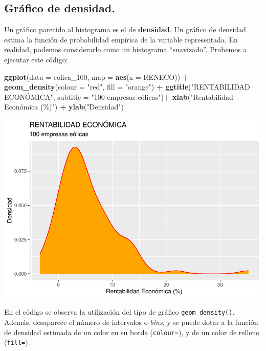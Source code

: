 \documentclass[
]{book}
\newenvironment{Shaded}{\begin{snugshade}}{\end{snugshade}}
\newcommand{\AttributeTok}[1]{\textcolor[rgb]{0.13,0.29,0.53}{#1}}
\newcommand{\FunctionTok}[1]{\textcolor[rgb]{0.13,0.29,0.53}{\textbf{#1}}}
\newcommand{\NormalTok}[1]{#1}
\newcommand{\SpecialCharTok}[1]{\textcolor[rgb]{0.81,0.36,0.00}{\textbf{#1}}}
\newcommand{\StringTok}[1]{\textcolor[rgb]{0.31,0.60,0.02}{#1}}
\let\Oldincludegraphics\includegraphics
\renewcommand{\includegraphics}[2][]{%
  \Oldincludegraphics[#1]{#2}%
}
\begin{document}
\subsection{Gráfico de densidad.}\label{gruxe1fico-de-densidad.}

Un gráfico parecido al histograma es el de \textbf{densidad}. Un gráfico de densidad estima la función de probabilidad empírica de la variable representada. En realidad, podemos considerarlo como un histograma ``suavizado''. Probemos a ejecutar este código:

\begin{Shaded}
\begin{Highlighting}[]
\FunctionTok{ggplot}\NormalTok{(}\AttributeTok{data =}\NormalTok{ eolica\_100, }\AttributeTok{map =} \FunctionTok{aes}\NormalTok{(}\AttributeTok{x =}\NormalTok{ RENECO)) }\SpecialCharTok{+}
  \FunctionTok{geom\_density}\NormalTok{(}\AttributeTok{colour =} \StringTok{"red"}\NormalTok{, }\AttributeTok{fill =} \StringTok{"orange"}\NormalTok{) }\SpecialCharTok{+}
  \FunctionTok{ggtitle}\NormalTok{(}\StringTok{"RENTABILIDAD ECONÓMICA"}\NormalTok{, }\AttributeTok{subtitle =} \StringTok{"100 empresas eólicas"}\NormalTok{)}\SpecialCharTok{+}
  \FunctionTok{xlab}\NormalTok{(}\StringTok{"Rentabilidad Económica (\%)"}\NormalTok{) }\SpecialCharTok{+}
  \FunctionTok{ylab}\NormalTok{(}\StringTok{"Densidad"}\NormalTok{)}
\end{Highlighting}
\end{Shaded}

\includegraphics{_main_files/figure-latex/unnamed-chunk-111-1.pdf}

En el código se observa la utilización del tipo de gráfico \texttt{geom\_density()}. Además, desaparece el número de intervalos o \emph{bins}, y se puede dotar a la función de densidad estimada de un color en su borde (\texttt{colour=}), y de un color de relleno (\texttt{fill=}).
\end{document}
